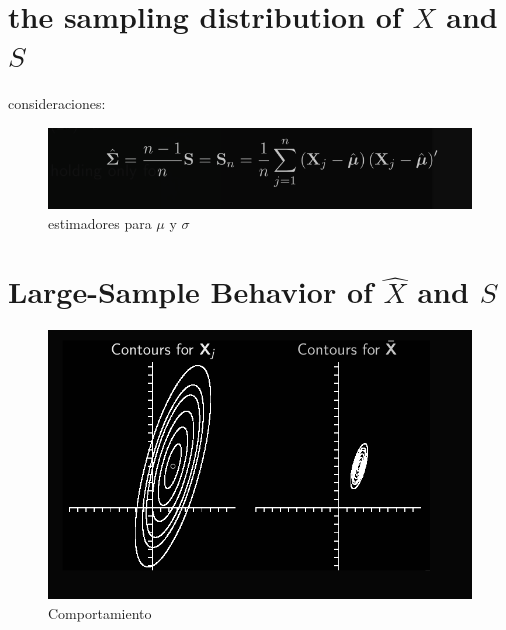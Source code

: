 \documentclass[10pt,a4paper]{article} %
\begin{document}
    \section{the sampling distribution of $ \hat{X}   $  and $ S  $ }
        consideraciones:

        \begin{figure}[h!]
            \centering
            \includegraphics[width=0.8\linewidth]{form.png}
            \caption{estimadores para $ \mu  $  y $ \sigma  $  }
            \label{fig}
        \end{figure}


    \section{Large-Sample Behavior of $ \hat{X}   $ and $ S  $ }
        \begin{figure}[h!]
            \centering
            \includegraphics[width=0.8\linewidth]{beh.png}
            \caption{Comportamiento}
            \label{duque está llorando jaja}
        \end{figure}























    \nocite{*}
    
    
\end{document}
